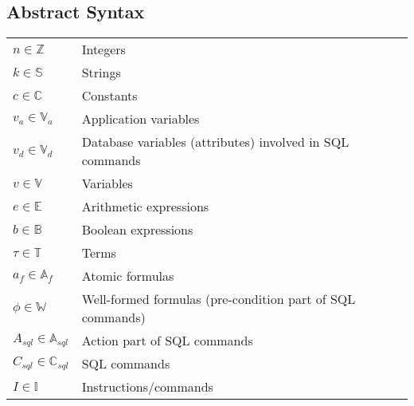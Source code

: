 \subsection{Abstract Syntax} \label{subsec:function-definitions}

\begin{center}
    \begin{tabular}{l l}
    $n \in \mathbb{Z}$                          & Integers                                                   \\
    $k \in \mathbb{S}$                                  & Strings                                                    \\
    $c \in \mathbb{C}$                          & Constants                                                 \\
    $v_a \in \mathbb{V}_a$                      & Application variables                                     \\
    $v_d \in \mathbb{V}_d$                      & Database variables (attributes) involved in SQL commands  \\
    $v \in \mathbb{V}$ & Variables                                                 \\
    $e \in \mathbb{E}$                          & Arithmetic expressions                                    \\
    $b \in \mathbb{B}$                          & Boolean expressions                                       \\
    $\tau \in \mathbb{T}$                       & Terms                                                     \\
    $a_f \in \mathbb{A}_f$                      & Atomic formulas                                           \\
    $\phi  \in \mathbb{W}$                      & Well-formed formulas (pre-condition part of SQL commands) \\
    $A_{sql} \in \mathbb{A}_{sql}$              & Action part of SQL commands                               \\
    $C_{sql} \in \mathbb{C}_{sql}$              & SQL commands                                              \\
    $I \in \mathbb{I}$                          & Instructions/commands                                     \\
    \end{tabular}
\end{center}

